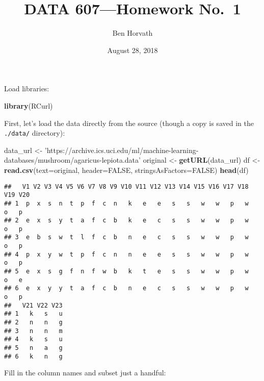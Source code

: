 \documentclass[11pt,]{article}
\title{DATA 607---Homework No.~1}
\author{Ben Horvath}
\date{August 28, 2018}
\newenvironment{Shaded}{\begin{snugshade}}{\end{snugshade}}
\newcommand{\DataTypeTok}[1]{\textcolor[rgb]{0.13,0.29,0.53}{#1}}
\newcommand{\KeywordTok}[1]{\textcolor[rgb]{0.13,0.29,0.53}{\textbf{#1}}}
\newcommand{\NormalTok}[1]{#1}
\newcommand{\OtherTok}[1]{\textcolor[rgb]{0.56,0.35,0.01}{#1}}
\newcommand{\StringTok}[1]{\textcolor[rgb]{0.31,0.60,0.02}{#1}}
\begin{document}
\maketitle

Load libraries:

\begin{Shaded}
\begin{Highlighting}[]
\KeywordTok{library}\NormalTok{(RCurl)}
\end{Highlighting}
\end{Shaded}

First, let's load the data directly from the source (though a copy is
saved in the \texttt{./data/} directory):

\begin{Shaded}
\begin{Highlighting}[]
\NormalTok{data_url <-}\StringTok{ 'https://archive.ics.uci.edu/ml/machine-learning-databases/mushroom/agaricus-lepiota.data'}
\NormalTok{original <-}\StringTok{ }\KeywordTok{getURL}\NormalTok{(data_url) }
\NormalTok{df <-}\StringTok{ }\KeywordTok{read.csv}\NormalTok{(}\DataTypeTok{text=}\NormalTok{original, }\DataTypeTok{header=}\OtherTok{FALSE}\NormalTok{, }\DataTypeTok{stringsAsFactors=}\OtherTok{FALSE}\NormalTok{)}
\KeywordTok{head}\NormalTok{(df)}
\end{Highlighting}
\end{Shaded}

\begin{verbatim}
##   V1 V2 V3 V4 V5 V6 V7 V8 V9 V10 V11 V12 V13 V14 V15 V16 V17 V18 V19 V20
## 1  p  x  s  n  t  p  f  c  n   k   e   e   s   s   w   w   p   w   o   p
## 2  e  x  s  y  t  a  f  c  b   k   e   c   s   s   w   w   p   w   o   p
## 3  e  b  s  w  t  l  f  c  b   n   e   c   s   s   w   w   p   w   o   p
## 4  p  x  y  w  t  p  f  c  n   n   e   e   s   s   w   w   p   w   o   p
## 5  e  x  s  g  f  n  f  w  b   k   t   e   s   s   w   w   p   w   o   e
## 6  e  x  y  y  t  a  f  c  b   n   e   c   s   s   w   w   p   w   o   p
##   V21 V22 V23
## 1   k   s   u
## 2   n   n   g
## 3   n   n   m
## 4   k   s   u
## 5   n   a   g
## 6   k   n   g
\end{verbatim}

Fill in the column names and subset just a handful:
\end{document}
